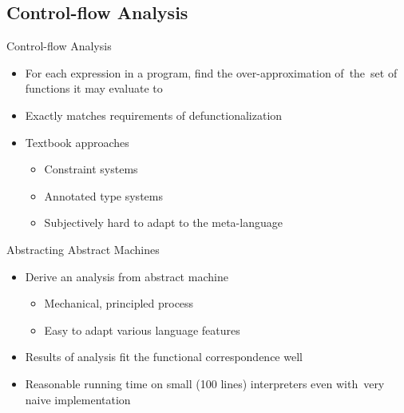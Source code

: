 \documentclass{beamer}
\begin{document}
\subsection{Control-flow Analysis}

\begin{frame}{Control-flow Analysis}
  \begin{itemize}
    \item For each expression in a program, find the over-approximation of~the~set of functions it may evaluate to
    \item Exactly matches requirements of defunctionalization
    \pause
    \item Textbook approaches
    \begin{itemize}
      \item Constraint systems
      \item Annotated type systems
      \item Subjectively hard to adapt to the meta-language
    \end{itemize}
  \end{itemize}
\end{frame}

\begin{frame}{Abstracting Abstract Machines}
  \begin{itemize}
    \item Derive an analysis from abstract machine
    \begin{itemize}
      \item Mechanical, principled process
      \item Easy to adapt various language features
    \end{itemize}
    \item Results of analysis fit the functional correspondence well
    \item Reasonable running time on small (100 lines) interpreters even with~very naive implementation
  \end{itemize}
\end{frame}



\end{document}
